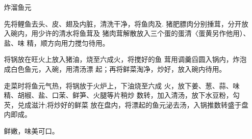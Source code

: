 \begin{recipe}{炸溜鱼元}

\ingredients



\cooking

\step 	先将鲤鱼去头、皮、翅及内脏，清洗干净，将鱼肉及. 猪肥膘肉分别捶茸，分开放入碗内，用少许的清水将鱼茸及 猪肉茸解散放入三个蛋的蛋清〈蛋黄另作他用）、盐、味 精，顺方向用力搅匀待用。

\step 	将锅放在旺火上放入猪油，烧至六成火，将搅好的鱼 茸用调羹舀圆入锅内，炸泡成白色鱼元，入碗，用清汤漂 起；再将鲜菜淘净，炒好，放入碗内待用。

\step 	走菜时将鱼元气热，将锅放于火炉上，下油烧至六成 火，放下姜、葱、蒜、味精、胡椒、盐、口茉、鲜笋、火腿等片稍炒 数转，加入清汤，放下水豆粉，勾芡，兑成滋汁;将炒好的鲜菜 放在盘内，将漂起的鱼元泌去汤，入锅推数转盛于盘内即成。

\notes

鲜嫩，味美可口。

\end{recipe}

